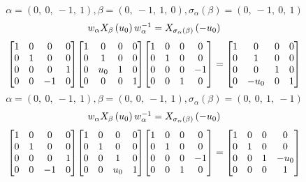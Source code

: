\documentclass[11pt]{article}
\theoremstyle{definition}
\begin{document}
\[
\alpha = \left( 0, \  0, \  -1, \  1\right), \beta = \left( 0, \  -1, \  1, \  0\right), \sigma_{\alpha}(\beta) = \left( 0, \  -1, \  0, \  1\right)
\]
\[
\scaletoalign{\textwidth}{w_{\alpha} X_{\beta}\left(u_{0}\right) w_{\alpha}^{-1} = X_{\sigma_{\alpha}\left(\beta\right)}\left(- u_{0}\right)}
\]
\[
\scaletoalign{\textwidth}{{\left[\begin{matrix}1 & 0 & 0 & 0\\0 & 1 & 0 & 0\\0 & 0 & 0 & 1\\0 & 0 & -1 & 0\end{matrix}\right]} {\left[\begin{matrix}1 & 0 & 0 & 0\\0 & 1 & 0 & 0\\0 & u_{0} & 1 & 0\\0 & 0 & 0 & 1\end{matrix}\right]} {\left[\begin{matrix}1 & 0 & 0 & 0\\0 & 1 & 0 & 0\\0 & 0 & 0 & -1\\0 & 0 & 1 & 0\end{matrix}\right]} = {\left[\begin{matrix}1 & 0 & 0 & 0\\0 & 1 & 0 & 0\\0 & 0 & 1 & 0\\0 & - u_{0} & 0 & 1\end{matrix}\right]}}
\]
\[
\alpha = \left( 0, \  0, \  -1, \  1\right), \beta = \left( 0, \  0, \  -1, \  1\right), \sigma_{\alpha}(\beta) = \left( 0, \  0, \  1, \  -1\right)
\]
\[
\scaletoalign{\textwidth}{w_{\alpha} X_{\beta}\left(u_{0}\right) w_{\alpha}^{-1} = X_{\sigma_{\alpha}\left(\beta\right)}\left(- u_{0}\right)}
\]
\[
\scaletoalign{\textwidth}{{\left[\begin{matrix}1 & 0 & 0 & 0\\0 & 1 & 0 & 0\\0 & 0 & 0 & 1\\0 & 0 & -1 & 0\end{matrix}\right]} {\left[\begin{matrix}1 & 0 & 0 & 0\\0 & 1 & 0 & 0\\0 & 0 & 1 & 0\\0 & 0 & u_{0} & 1\end{matrix}\right]} {\left[\begin{matrix}1 & 0 & 0 & 0\\0 & 1 & 0 & 0\\0 & 0 & 0 & -1\\0 & 0 & 1 & 0\end{matrix}\right]} = {\left[\begin{matrix}1 & 0 & 0 & 0\\0 & 1 & 0 & 0\\0 & 0 & 1 & - u_{0}\\0 & 0 & 0 & 1\end{matrix}\right]}}
\]
\end{document}
